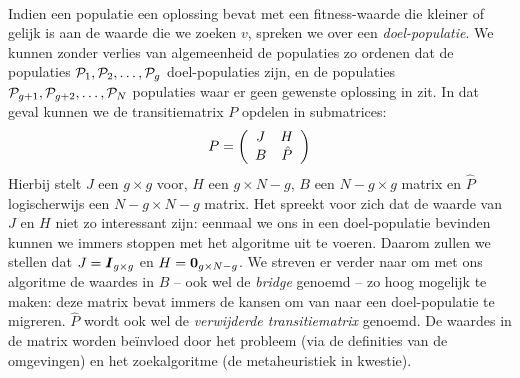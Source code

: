 \paragraph{}
Indien een populatie een oplossing bevat met een fitness-waarde die kleiner of gelijk is aan de waarde die we zoeken $v$, spreken we over een \emph{doel-populatie}. We kunnen zonder verlies van algemeenheid de populaties zo ordenen dat de populaties $\PopSet_1,\PopSet_2,\ldots,\PopSet_g$ doel-populaties zijn, en de populaties $\PopSet_{g+1},\PopSet_{g+2},\ldots,\PopSet_N$ populaties waar er geen gewenste oplossing in zit. In dat geval kunnen we de transitiematrix $P$ opdelen in submatrices:
\begin{equation}
P=\brak{\begin{array}{cc}
J&H\\
B&\hat{P}
\end{array}}
\end{equation}
Hierbij stelt $J$ een $g\times g$ voor, $H$ een $g\times N-g$, $B$ een $N-g\times g$ matrix en $\hat{P}$ logischerwijs een $N-g\times N-g$ matrix. Het spreekt voor zich dat de waarde van $J$ en $H$ niet zo interessant zijn: eenmaal we ons in een doel-populatie bevinden kunnen we immers stoppen met het algoritme uit te voeren. Daarom zullen we stellen dat $J=\identitymatrix[g\times g]$ en $H=\zeromatrix[g\times N-g]$. We streven er verder naar om met ons algoritme de waardes in $B$ -- ook wel de \emph{bridge} genoemd -- zo hoog mogelijk te maken: deze matrix bevat immers de kansen om van naar een doel-populatie te migreren. $\hat{P}$ wordt ook wel de \emph{verwijderde transitiematrix} genoemd. De waardes in de matrix worden be\"invloed door het probleem (via de definities van de omgevingen) en het zoekalgoritme (de metaheuristiek in kwestie).
